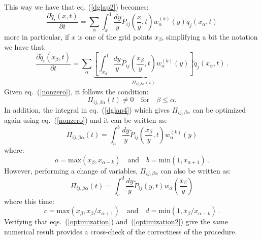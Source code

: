 \documentclass[10pt,a4paper]{article}
\begin{document}
This way we have that eq. (\ref{dglap2}) becomes:
\begin{equation}\label{dglap3}
\frac{\partial \tilde{q}_{i}(x,t)}{\partial t}=\sum_{\alpha}\int^{1}_{x}\frac{dy}y \tilde{P}_{ij}\left(\frac{x}{y},t\right)w_{\alpha}^{(k)}(y)\tilde{q}_{j}(x_{\alpha},t)
\end{equation}
more in particular, if $x$ is one of the grid points $x_\beta$, simplifying a bit the notation we have that:
\begin{equation}\label{dglap4}
\frac{\partial \tilde{q}_{i}(x_\beta,t)}{\partial t}=\sum_{\alpha}\underbrace{\left[\int^{1}_{x_\beta}\frac{dy}y \tilde{P}_{ij}\left(\frac{x_\beta}{y},t\right)w_{\alpha}^{(k)}(y)\right]}_{\Pi_{ij,\beta\alpha}(t)}\tilde{q}_{j}(x_{\alpha},t)\,.
\end{equation}
Given eq.~(\ref{nonzero}), it follows the condition:
\begin{equation}\label{nonzero2}
\Pi_{ij,\beta\alpha}(t) \neq 0 \quad\mbox{for}\quad \beta \leq \alpha.  
\end{equation}
In addition, the integral in eq.~(\ref{dglap4}) which gives $\Pi_{ij,\beta\alpha}$ can be optimized again using eq.~(\ref{nonzero}) and it can be written as:
\begin{equation}\label{optimization}
\Pi_{ij,\beta\alpha}(t) = \int^{b}_{a}\frac{dy}y \tilde{P}_{ij}\left(\frac{x_\beta}{y},t\right)w_{\alpha}^{(k)}(y)
\end{equation}
where:
\begin{equation}
a =  \mbox{max}(x_\beta,x_{\alpha-k})\quad\mbox{and}\quad b = \mbox{min}(1,x_{\alpha+1})\,.
\end{equation}
However, performing a change of variables, $\Pi_{ij,\beta\alpha}$ can also be written as:
\begin{equation}\label{optimization2}
\Pi_{ij,\beta\alpha}(t) = \int^{d}_{c}\frac{dy}y \tilde{P}_{ij}(y,t)w_{\alpha}\left(\frac{x_\beta}{y}\right)
\end{equation}
where this time:
\begin{equation}\label{bounds2}
c =  \mbox{max}(x_\beta,x_\beta/x_{\alpha+1}) \quad\mbox{and}\quad d = \mbox{min}(1,x_\beta/x_{\alpha-k}) \,.
\end{equation}
Verifying that eqs.~(\ref{optimization}) and~(\ref{optimization2}) give the same numerical result provides a cross-check of the correctness of the procedure.
\end{document}
